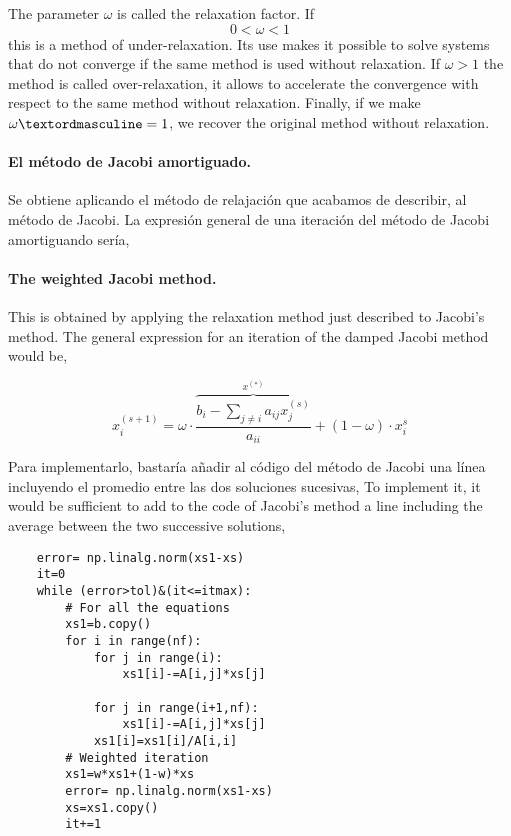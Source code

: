 \begin{paracol}{2}
The parameter $\omega$ is called the relaxation factor. If $$0<\omega<1$$ this is a method of under-relaxation. Its use makes it possible to solve systems that do not converge if the same method is used without relaxation. If $\omega>1$ the method is called over-relaxation, it allows to accelerate the convergence with respect to the same method without relaxation. Finally, if we make $\omegaº=1$, we recover the original method without relaxation.

\switchcolumn

\paragraph{El método de Jacobi amortiguado.}  Se obtiene aplicando el método de relajación que acabamos de describir, al método de Jacobi. La expresión general de una iteración del método de Jacobi amortiguando sería,

\switchcolumn
\paragraph{The weighted Jacobi method.} This is obtained by applying the relaxation method just described to Jacobi's method. The general expression for an iteration of the damped Jacobi method would be,
\end{paracol}

\begin{equation*}
x_i^{(s+1)}=\omega\cdot \overbrace{\frac{b_i-\sum_{j\neq i}a_{ij}x_j^{(s)}}{a_{ii}}}^{x^{(*)}}+(1- \omega)\cdot x_i^{s}
\end{equation*}

\begin{paracol}{2}
    Para implementarlo, bastaría añadir al código del método de Jacobi una línea incluyendo el promedio entre las dos soluciones sucesivas,
    \switchcolumn
To implement it, it would be sufficient to add to the code of Jacobi's method a line including the average between the two successive solutions,
\end{paracol}

\begin{verbatim}
    error= np.linalg.norm(xs1-xs)
    it=0
    while (error>tol)&(it<=itmax):
        # For all the equations
        xs1=b.copy()
        for i in range(nf):
            for j in range(i):
                xs1[i]-=A[i,j]*xs[j]

            for j in range(i+1,nf):
                xs1[i]-=A[i,j]*xs[j]
            xs1[i]=xs1[i]/A[i,i]
        # Weighted iteration
        xs1=w*xs1+(1-w)*xs
        error= np.linalg.norm(xs1-xs)
        xs=xs1.copy()
        it+=1
\end{verbatim}

